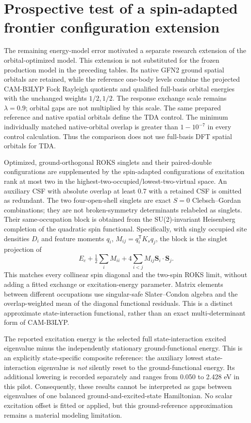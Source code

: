 \section{Prospective test of a spin-adapted frontier configuration extension}
The remaining energy-model error motivated a separate research extension of the
orbital-optimized model. This extension is not substituted for the frozen
production model in the preceding tables. Its native GFN2 ground spatial
orbitals are retained, while the reference one-body levels combine the
projected CAM-B3LYP Fock Rayleigh quotients and qualified full-basis orbital
energies with the unchanged weights $1/2,1/2$. The response exchange scale
remains $\lambda=0.9$; orbital gaps are not multiplied by this scale. The
same prepared reference and native spatial orbitals define the TDA control.
The minimum individually matched native-orbital overlap is greater than
$1-10^{-7}$ in every control calculation. Thus the comparison does not use
full-basis DFT spatial orbitals for TDA.

Optimized, ground-orthogonal ROKS singlets and their paired-double
configurations are supplemented by the spin-adapted configurations of
excitation rank at most two in the highest-two-occupied/lowest-two-virtual
space. An auxiliary CSF with absolute overlap at least 0.7 with a retained
CSF is omitted as redundant. The two four-open-shell singlets are exact
$S=0$ Clebsch--Gordan combinations; they are not broken-symmetry determinants
relabeled as singlets. Their same-occupation block is obtained from the
SU(2)-invariant Heisenberg completion of the quadratic spin functional.
Specifically, with singly occupied site densities $D_i$ and feature moments
$q_i$, $M_{ij}=q_i^{\mathsf T}K_s q_j$, the block is the singlet projection of
\begin{equation}
 E_c+\tfrac12\sum_i M_{ii}+4\sum_{i<j}M_{ij}\mathbf S_i\cdot\mathbf S_j.
\end{equation}
This matches every collinear spin diagonal and the two-spin ROKS limit,
without adding a fitted exchange or excitation-energy parameter. Matrix
elements between different occupations use singular-safe Slater--Condon
algebra and the overlap-weighted mean of the diagonal functional residuals.
This is a distinct approximate state-interaction functional, rather than
an exact multi-determinant form of CAM-B3LYP.

The reported excitation energy is the selected full state-interaction
excited eigenvalue minus the independently stationary ground-functional
energy. This is an explicitly state-specific composite reference: the
auxiliary lowest state-interaction eigenvalue is \emph{not} silently reset
to the ground-functional energy. Its additional lowering is recorded
separately and ranges from 0.050 to 2.428 eV in this pilot. Consequently,
these results cannot be interpreted as gaps between eigenvalues of one
balanced ground-and-excited-state Hamiltonian. No scalar excitation offset
is fitted or applied, but this ground-reference approximation remains a
material modeling limitation.

